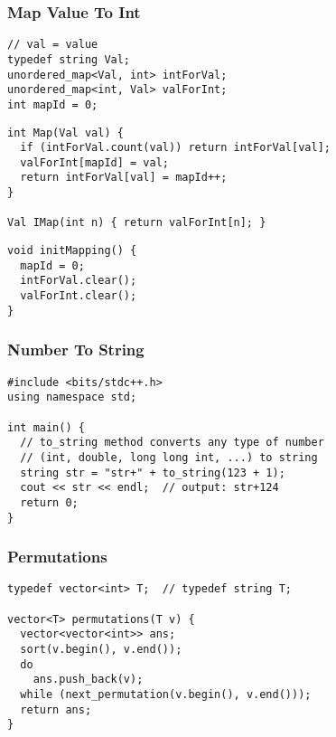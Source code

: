 \documentclass[twoside]{article}
\begin{document}
\begin{multicols*}{2}
\subsubsectionfont{\large\bfseries\sffamily\underline}
\subsubsection*{Map Value To Int}
\begin{verbatim}
// val = value
typedef string Val;
unordered_map<Val, int> intForVal;
unordered_map<int, Val> valForInt;
int mapId = 0;
\end{verbatim}
\vspace{-12pt}
\begin{verbatim}
int Map(Val val) {
  if (intForVal.count(val)) return intForVal[val];
  valForInt[mapId] = val;
  return intForVal[val] = mapId++;
}

Val IMap(int n) { return valForInt[n]; }
\end{verbatim}
\vspace{-12pt}
\begin{verbatim}
void initMapping() {
  mapId = 0;
  intForVal.clear();
  valForInt.clear();
}
\end{verbatim}

\subsubsectionfont{\large\bfseries\sffamily\underline}
\subsubsection*{Number To String}
\begin{verbatim}
#include <bits/stdc++.h>
using namespace std;

int main() {
  // to_string method converts any type of number
  // (int, double, long long int, ...) to string
  string str = "str+" + to_string(123 + 1);
  cout << str << endl;  // output: str+124
  return 0;
}
\end{verbatim}

\subsubsectionfont{\large\bfseries\sffamily\underline}
\subsubsection*{Permutations}
\begin{verbatim}
typedef vector<int> T;  // typedef string T;

vector<T> permutations(T v) {
  vector<vector<int>> ans;
  sort(v.begin(), v.end());
  do
    ans.push_back(v);
  while (next_permutation(v.begin(), v.end()));
  return ans;
}
\end{verbatim}


\end{multicols*}
\end{document}

